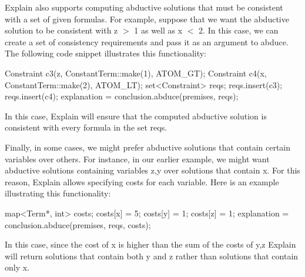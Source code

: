 \-Explain also supports computing abductive solutions that must be consistent with a set of given formulas. \-For example, suppose that we want the abductive solution to be consistent with z $>$ 1 as well as x $<$ 2. \-In this case, we can create a set of consistency requirements and pass it as an argument to abduce. \-The following code snippet illustrates this functionality\-:

\begin{DoxyVerb}
Constraint c3(z, ConstantTerm::make(1), ATOM_GT);
Constraint c4(x, ConstantTerm::make(2), ATOM_LT);
set<Constraint> reqs;
reqs.insert(c3);
reqs.insert(c4);
explanation = conclusion.abduce(premises, reqs);
\end{DoxyVerb}


\-In this case, \-Explain will ensure that the computed abductive solution is consistent with every formula in the set reqs.

\-Finally, in some cases, we might prefer abductive solutions that contain certain variables over others. \-For instance, in our earlier example, we might want abductive solutions containing variables z,y over solutions that contain x. \-For this reason, \-Explain allows specifying costs for each variable. \-Here is an example illustrating this functionality\-:

\begin{DoxyVerb}
map<Term*, int> costs;
costs[x] = 5;
costs[y] = 1;
costs[z] = 1;
explanation = conclusion.abduce(premises, reqs, costs);
\end{DoxyVerb}


\-In this case, since the cost of x is higher than the sum of the costs of y,z \-Explain will return solutions that contain both y and z rather than solutions that contain only x. 